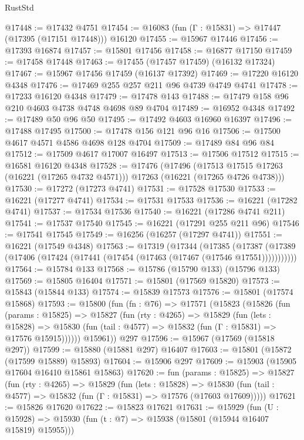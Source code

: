 \begin{lexlean}{RustStd}
\begin{coremodule}
@17448 := @17432 @4751
@17454 := @16083 (fun (Γ : @15831) => @17447 (@17395 (@17151 @17448))) @16120
@17455 := @15967 @17446
@17456 := @17393 @16874
@17457 := @15801 @17456
@17458 := @16877 @17150
@17459 := @17458 @17448
@17463 := @17455 (@17457 @17459) (@16132 @17324)
@17467 := @15967 @17456 @17459 (@16137 @17392)
@17469 := @17220 @16120 @4348
@17476 := @17469 @255 @257 @211 @96 @4739 @4749 @4741
@17478 := @17233 @16120 @4348
@17479 := @17478 @143
@17488 := @17479 @158 @96 @210 @4603 @4738 @4748 @4698 @89 @4704
@17489 := @16952 @4348
@17492 := @17489 @50 @96 @50
@17495 := @17492 @4603 @16960 @16397
@17496 := @17488 @17495
@17500 := @17478 @156 @121 @96 @16
@17506 := @17500 @4617 @4571 @4586 @4698 @128 @4704
@17509 := @17489 @84 @96 @84
@17512 := @17509 @4617 @17007 @16497
@17513 := @17506 @17512
@17515 := @16581 @16120 @4348
@17528 := @17476
    (@17496
      (@17513 @17515 @17263 (@16221 (@17265 @4732 @4571)))
      @17263
      (@16221 (@17265 @4726 @4738)))
@17530 := @17272 (@17273 @4741)
@17531 := @17528 @17530
@17533 := @16221 (@17277 @4741)
@17534 := @17531 @17533
@17536 := @16221 (@17282 @4741)
@17537 := @17534 @17536
@17540 := @16221 (@17286 @4741 @211)
@17541 := @17537 @17540
@17545 := @16221 (@17291 @255 @211 @96)
@17546 := @17541 @17545
@17549 := @16256 (@16257 (@17297 @4741))
@17551 := @16221 (@17549 @4348)
@17563 := @17319
    (@17344
      (@17385
        (@17387 (@17389 (@17406 (@17424 (@17441 (@17454 (@17463 (@17467 (@17546 @17551)))))))))))
@17564 := @15784 @133
@17568 := @15786 (@15790 @133) (@15796 @133)
@17569 := @15805 @16404
@17571 := @15801 (@17569 @15820)
@17573 := @15843 (@15844 @133)
@17574 := @15839 @17573
@17576 := @15801 (@17574 @15868)
@17593 := @15800
    (fun (fn : @76) =>
    @17571
      (@15823
        (@15826
          (fun (params : @15825) =>
          @15827
            (fun (rty : @4265) =>
            @15829
              (fun (lets : @15828) =>
              @15830 (fun (tail : @4577) => @15832 (fun (Γ : @15831) => @17576 @15915))))))
        @15961))
    @297
@17596 := @15967 (@17569 (@15818 @297))
@17599 := @15880 (@15881 @297) @16407
@17603 := @15801 (@15872 (@17599 @15889) @15893)
@17604 := @15906 @297
@17609 := @15903 (@15905 @17604 @16410 @15861 @15863)
@17620 := fun (params : @15825) =>
  @15827
    (fun (rty : @4265) =>
    @15829
      (fun (lets : @15828) =>
      @15830 (fun (tail : @4577) => @15832 (fun (Γ : @15831) => @17576 (@17603 @17609)))))
@17621 := @15826 @17620
@17622 := @15823 @17621
@17631 := @15929
    (fun (U : @15928) => @15930 (fun (t : @7) => @15938 (@15801 (@15944 @16407 @15819) @15955)))

\end{coremodule}
\end{lexlean}
